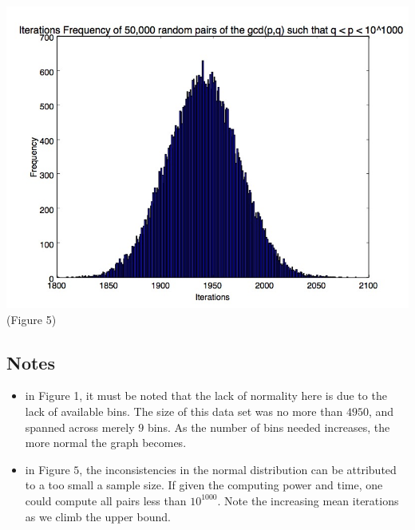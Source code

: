 \documentclass[8pt]{beamer}
\begin{document}
\begin{frame}
		\center \includegraphics[scale=.3]{1000_digit_numbers.jpg}
		\center \tiny(Figure 5)

\end{frame}

\subsection{Notes}
\begin{frame}
\begin{itemize}
\item in Figure 1, it must be noted that the lack of normality here is due to the lack of available bins. The size of this data set was no more than $4950$, and spanned across merely $9$ bins. As the number of bins needed increases, the more normal the graph becomes.
\item in Figure $5$, the inconsistencies in the normal distribution can be attributed to a too small a sample size. If given the computing power and time, one could compute all pairs less than $10^{1000}$. Note the increasing mean iterations as we climb the upper bound.
\end{itemize}

\end{frame}

\end{document}

